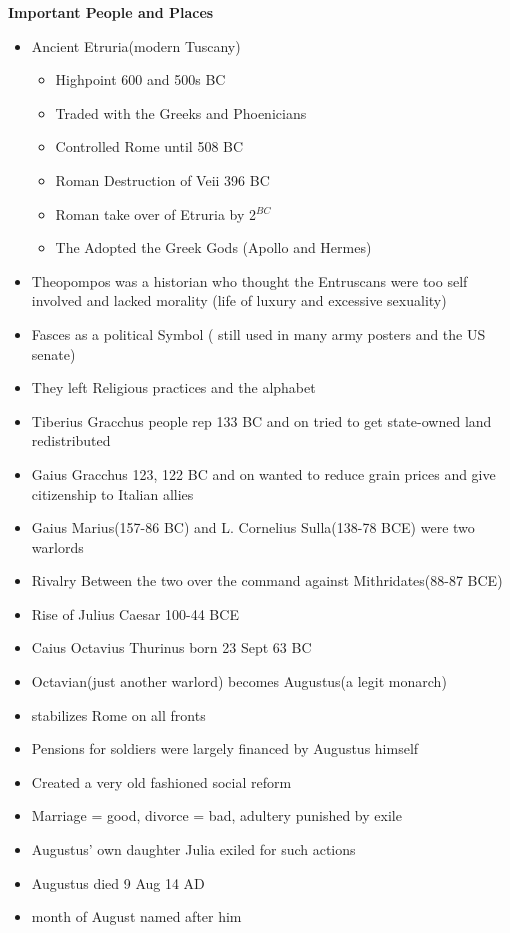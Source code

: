 \documentclass[12pt,a4paper]{report}
\begin{document}
\textbf{Important People and Places}
\begin{itemize}
\item Ancient Etruria(modern Tuscany)
\begin{itemize}
\item Highpoint 600 and 500s BC
\item Traded with the Greeks and Phoenicians
\item Controlled Rome until 508 BC
\item Roman Destruction of Veii 396 BC
\item Roman take over of Etruria by 2$^{BC}$
\item The Adopted the Greek Gods (Apollo and Hermes)
\end{itemize}
\item Theopompos was a historian who thought the Entruscans were too self involved and lacked morality (life of luxury and excessive sexuality)
\item Fasces as a political Symbol ( still used in many army posters and the US senate)
\item They left Religious practices and the alphabet
\item Tiberius Gracchus people rep 133 BC and on tried to get state-owned land redistributed
\item Gaius Gracchus 123, 122 BC and on  wanted to reduce grain prices and give citizenship to Italian allies
\item Gaius Marius(157-86 BC) and L. Cornelius Sulla(138-78 BCE) were two warlords
\item Rivalry Between the two over the command against Mithridates(88-87 BCE)
\item Rise of Julius Caesar 100-44 BCE
\item Caius Octavius Thurinus born 23 Sept 63 BC
\item Octavian(just another warlord) becomes Augustus(a legit monarch)
\item stabilizes Rome on all fronts
\item Pensions for soldiers were largely financed by Augustus himself
\item Created a very old fashioned social reform
\item Marriage = good, divorce = bad, adultery punished by exile
\item Augustus' own daughter Julia exiled for such actions
\item Augustus died 9 Aug 14 AD
\item month of August named after him
\end{itemize}
\end{document}
